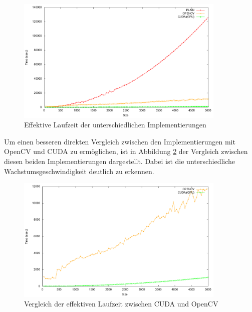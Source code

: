 \documentclass{llncs}
\begin{document}
\begin{figure}
	\centering
	\includegraphics[width=10cm,keepaspectratio]{analysis_gpu.png}
	\caption{Effektive Laufzeit der unterschiedlichen Implementierungen}
	\label{fig:analysis_gpu}
\end{figure}
\newpage
Um einen besseren direkten Vergleich zwischen den Implementierungen mit OpenCV und CUDA zu ermöglichen, ist in Abbildung \ref{fig:analysis_no_plain} der Vergleich zwischen diesen beiden Implementierungen dargestellt. Dabei ist die unterschiedliche Wachstumsgeschwindigkeit deutlich zu erkennen.

\begin{figure}
	\centering
	\includegraphics[width=10cm,keepaspectratio]{analysis_no_plain.png}
	\caption{Vergleich der effektiven Laufzeit zwischen CUDA und OpenCV}
	\label{fig:analysis_no_plain}
\end{figure}
%
\end{document}

